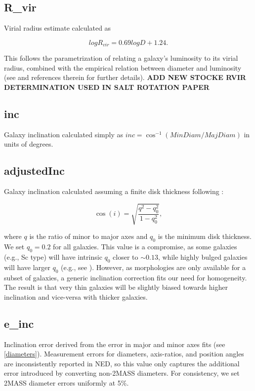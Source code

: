 \documentclass[twocolumn,tighten]{aastex62}
\begin{document}
\subsection{R\_vir} \label{R_vir}
Virial radius estimate calculated as

\begin{equation}
log R_{vir} = 0.69 log D + 1.24.
\end{equation}

\noindent This follows the parametrization of \cite{stocke2013} relating a galaxy's luminosity to its virial radius, combined with the \cite{wakker2009} empirical relation between diameter and luminosity (see \citealt{wakker2015} and references therein for further details). \textbf{ADD NEW STOCKE RVIR DETERMINATION USED IN SALT ROTATION PAPER}

\subsection{inc} \label{inc}
Galaxy inclination calculated simply as $inc = \cos^{-1} (MinDiam / MajDiam)$ in units of degrees.

\subsection{adjustedInc} \label{adjustedInc}
Galaxy inclination calculated assuming a finite disk thickness following \cite{heidmann1972}:

\begin{equation}
	\cos(i) = \sqrt{\frac{q^2 - q_0^2}{1 - q_0^2}},
	\label{incEq}
\end{equation}

\noindent where $q$ is the ratio of minor to major axes and $q_0$ is the minimum disk thickness. We set $q_0 = 0.2$ for all galaxies. This value is a compromise, as some galaxies (e.g., Sc type) will have intrinsic $q_0$ closer to $\sim 0.13$, while highly bulged galaxies will have larger $q_0$ (e.g., see \citealt{heidmann1972c}). However, as morphologies are only available for a subset of galaxies, a generic inclination correction fits our need for homogeneity. The result is that very thin galaxies will be slightly biased towards higher inclination and vice-versa with thicker galaxies.

\subsection{e\_inc} \label{e_inc}
Inclination error derived from the error in major and minor axes fits (see \ref{diameters}). Measurement errors for diameters, axis-ratios, and position angles are inconsistently reported in NED, so this value only captures the additional error introduced by converting non-2MASS diameters. For consistency, we set 2MASS diameter errors uniformly at 5\%.
\end{document}
